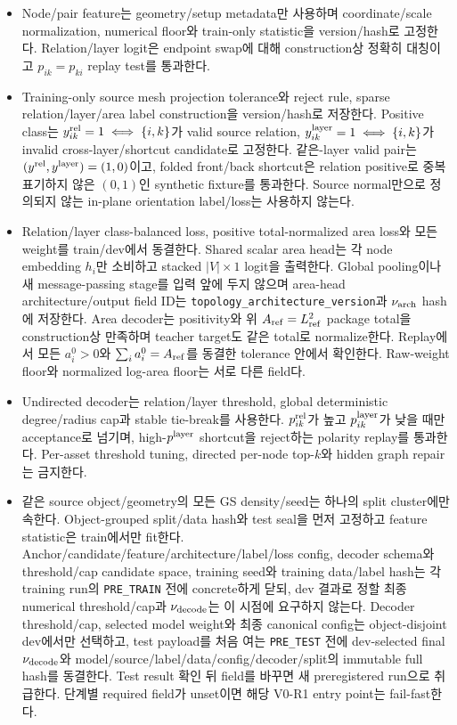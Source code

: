 \documentclass[10pt]{article}
\newcommand{\code}[1]{{\small\nolinkurl{#1}}}
\begin{document}
\begin{itemize}
  Candidate recall 부족을 topology-model false negative로 세지 않는다.
  \item [\(\square\)] Node/pair feature는 geometry/setup metadata만 사용하며 coordinate/scale
  normalization, numerical floor와 train-only statistic을 version/hash로 고정한다.
  Relation/layer logit은 endpoint swap에 대해 construction상 정확히 대칭이고
  \(p_{ik}=p_{ki}\) replay test를 통과한다.
  \item [\(\square\)] Training-only source mesh projection tolerance와 reject rule,
  sparse relation/layer/area label construction을 version/hash로 저장한다.
  Positive class는
  \(y_{ik}^{\rm rel}=1\iff\{i,k\}\)가 valid source relation,
  \(y_{ik}^{\rm layer}=1\iff\{i,k\}\)가 invalid cross-layer/shortcut candidate로 고정한다.
  같은-layer valid pair는 \((y^{\rm rel},y^{\rm layer})=(1,0)\)이고,
  folded front/back shortcut은 relation positive로 중복 표기하지 않은
  \((0,1)\)인 synthetic fixture를 통과한다.
  Source normal만으로 정의되지 않는 in-plane orientation label/loss는 사용하지 않는다.
  \item [\(\square\)] Relation/layer class-balanced loss, positive total-normalized area loss와
  모든 weight를 train/dev에서 동결한다. Shared scalar area head는 각 node embedding \(h_i\)만
  소비하고 stacked \(|V|\times1\) logit을 출력한다. Global pooling이나 새 message-passing stage를
  입력 앞에 두지 않으며 area-head architecture/output field ID는
  \code{topology\_architecture\_version}과 \(\nu_{\rm arch}\) hash에 저장한다.
  Area decoder는 positivity와 위 \(A_{\rm ref}=L_{\rm ref}^2\) package total을 construction상
  만족하며 teacher target도 같은 total로 normalize한다. Replay에서 모든 \(a_i^0>0\)와
  \(\sum_i a_i^0=A_{\rm ref}\)를 동결한 tolerance 안에서 확인한다.
  Raw-weight floor와 normalized log-area floor는 서로 다른 field다.
  \item [\(\square\)] Undirected decoder는 relation/layer threshold, global deterministic
  degree/radius cap과 stable tie-break를 사용한다.
  \(p_{ik}^{\rm rel}\)가 높고 \(p_{ik}^{\rm layer}\)가 낮을 때만 acceptance로 넘기며,
  high-\(p^{\rm layer}\) shortcut을 reject하는 polarity replay를 통과한다. Per-asset threshold tuning,
  directed per-node top-\(k\)와 hidden graph repair는 금지한다.
  \item [\(\square\)] 같은 source object/geometry의 모든 GS density/seed는 하나의 split cluster에만
  속한다. Object-grouped split/data hash와 test seal을 먼저 고정하고 feature statistic은 train에서만 fit한다.
  Anchor/candidate/feature/architecture/label/loss config, decoder schema와 threshold/cap candidate space,
  training seed와 training data/label hash는 각 training run의 \code{PRE\_TRAIN} 전에 concrete하게 닫되,
  dev 결과로 정할 최종 numerical threshold/cap과 \(\nu_{\rm decode}\)는 이 시점에 요구하지 않는다.
  Decoder threshold/cap, selected model weight와 최종 canonical config는 object-disjoint dev에서만 선택하고,
  test payload를 처음 여는 \code{PRE\_TEST} 전에 dev-selected final \(\nu_{\rm decode}\)와
  model/source/label/data/config/decoder/split의 immutable full hash를 동결한다.
  Test result 확인 뒤 field를 바꾸면 새 preregistered run으로 취급한다.
  단계별 required field가 unset이면 해당 V0-R1 entry point는 fail-fast한다.
\end{itemize}
\end{document}
